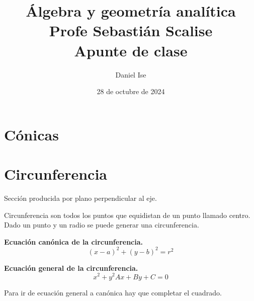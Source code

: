 \documentclass[12pt]{article}
\title{Álgebra y geometría analítica\\Profe Sebastián Scalise\\Apunte de clase}
\author{Daniel Ise}
\date{28 de octubre de 2024}
\begin{document}
\maketitle

\tableofcontents

\section{Cónicas}

\section{Circunferencia}

Sección producida por plano perpendicular al eje.

Circunferencia son todos los puntos que equidistan de un punto llamado centro.
Dado un punto y un radio se puede generar una circunferencia.

\textbf{Ecuación canónica de la circunferencia.}
\begin{equation}
    (x-a)^{2} + (y-b)^{2} = r^{2}
\end{equation}

\textbf{Ecuación general de la circunferencia.}
\begin{equation}
    x^{2} + y^{2} Ax + By + C = 0
\end{equation}

Para ir de ecuación general a canónica hay que completar el cuadrado.
\end{document}
